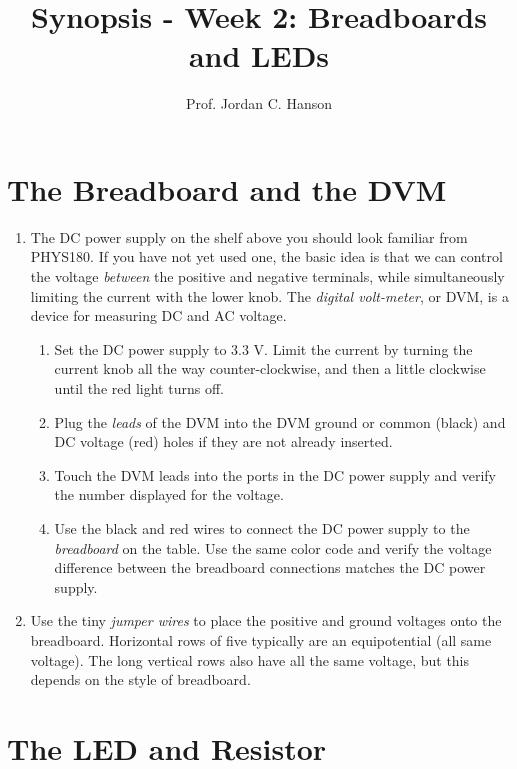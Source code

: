 \documentclass{article}
\begin{document}
\title{Synopsis - Week 2: Breadboards and LEDs}
\author{Prof. Jordan C. Hanson}

\maketitle

\section{The Breadboard and the DVM}

\begin{enumerate}
\item The DC power supply on the shelf above you should look familiar from PHYS180.  If you have not yet used one, the basic idea is that we can control the voltage \textit{between} the positive and negative terminals, while simultaneously limiting the current with the lower knob.  The \textit{digital volt-meter}, or DVM, is a device for measuring DC and AC voltage.
\begin{enumerate}
\item Set the DC power supply to 3.3 V.  Limit the current by turning the current knob all the way counter-clockwise, and then a little clockwise until the red light turns off.
\item Plug the \textit{leads} of the DVM into the DVM ground or common (black) and DC voltage (red) holes if they are not already inserted.
\item Touch the DVM leads into the ports in the DC power supply and verify the number displayed for the voltage.
\item Use the black and red wires to connect the DC power supply to the \textit{breadboard} on the table.  Use the same color code and verify the voltage difference between the breadboard connections matches the DC power supply.
\end{enumerate}
\item Use the tiny \textit{jumper wires} to place the positive and ground voltages onto the breadboard.  Horizontal rows of five typically are an equipotential (all same voltage).  The long vertical rows also have all the same voltage, but this depends on the style of breadboard.
\end{enumerate}

\section{The LED and Resistor}
\end{document}
